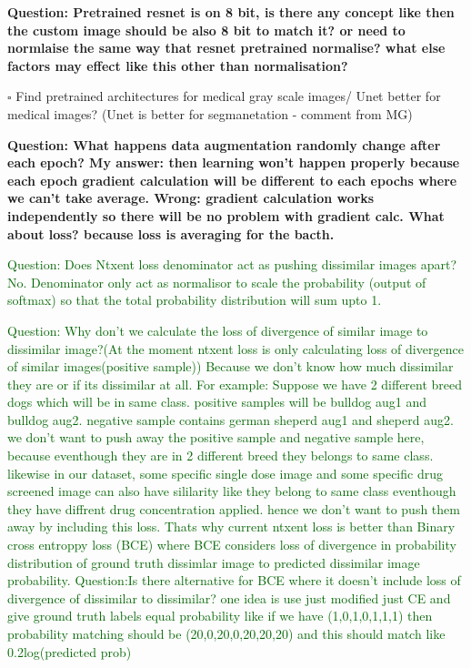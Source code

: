\documentclass[12pt,twoside,a4paper,parskip]{scrbook} %
\begin{document}
\textbf{Question: Pretrained resnet is on 8 bit, is there any concept like then the custom image should be also 8 bit to match it? or need to normlaise the same way that resnet pretrained normalise? what else factors may effect like this other than normalisation? } 

$\square$ Find pretrained architectures for medical gray scale images/ Unet better for medical images? (Unet is better for segmanetation - comment from MG)

\textbf{Question: What happens data augmentation randomly change after each epoch? My answer: then learning won't happen properly because each epoch gradient calculation will be different to each epochs where we can't take average. Wrong: gradient calculation works independently so there will be no problem with gradient calc. What about loss? because loss is averaging for the bacth.} 

\textcolor{darkgreen}{Question: Does Ntxent loss denominator act as pushing dissimilar images apart?}
\textcolor{darkgreen}{No. Denominator only act as normalisor to scale the probability (output of softmax) so that the total probability distribution will sum upto 1.} 

\textcolor{darkgreen}{Question: Why don’t we calculate the loss of divergence of similar image to dissimilar image?(At the moment ntxent loss is only calculating loss of divergence of similar images(positive sample))}
\textcolor{darkgreen}{Because we don’t know how much dissimilar they are or if its dissimilar at all. For example: Suppose we have 2 different breed dogs which will be in same class. positive samples will be bulldog aug1 and bulldog aug2. negative sample contains german sheperd aug1 and sheperd aug2. we don't want to push away the positive sample and negative sample here, because eventhough they are in 2 different breed they belongs to same class. likewise in our dataset, some specific single dose image and some specific drug screened image can also have sililarity like they belong to same class eventhough they have diffrent drug concentration applied. hence we don't want to push them away by including this loss.
Thats why current ntxent loss is better than Binary cross entroppy loss (BCE) where BCE considers loss of divergence in probability distribution of ground truth dissimlar image to predicted dissimilar image probability.}
\textcolor{darkgreen}{Question:Is there alternative for BCE where it doesn't include loss of divergence of dissimilar to dissimilar? one idea is use just modified just CE and give ground truth labels equal probability like if we have (1,0,1,0,1,1,1) then probability matching should be (20,0,20,0,20,20,20) and this should match like 0.2log(predicted prob)}
\end{document}
